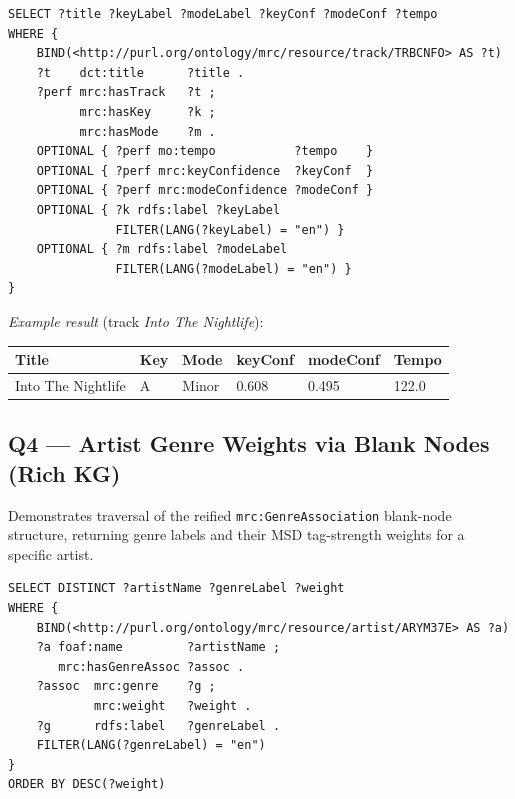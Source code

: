 \begin{footnotesize}
\begin{verbatim}
SELECT ?title ?keyLabel ?modeLabel ?keyConf ?modeConf ?tempo
WHERE {
    BIND(<http://purl.org/ontology/mrc/resource/track/TRBCNFO> AS ?t)
    ?t    dct:title      ?title .
    ?perf mrc:hasTrack   ?t ;
          mrc:hasKey     ?k ;
          mrc:hasMode    ?m .
    OPTIONAL { ?perf mo:tempo           ?tempo    }
    OPTIONAL { ?perf mrc:keyConfidence  ?keyConf  }
    OPTIONAL { ?perf mrc:modeConfidence ?modeConf }
    OPTIONAL { ?k rdfs:label ?keyLabel
               FILTER(LANG(?keyLabel) = "en") }
    OPTIONAL { ?m rdfs:label ?modeLabel
               FILTER(LANG(?modeLabel) = "en") }
}
\end{verbatim}
\end{footnotesize}

\noindent\textit{Example result} (track \textit{Into The Nightlife}):

\begin{table}[H]
\centering\footnotesize
\begin{tabular}{llllll}
\toprule
Title & Key & Mode & keyConf & modeConf & Tempo \\ \midrule
Into The Nightlife & A & Minor & 0.608 & 0.495 & 122.0 \\
\bottomrule
\end{tabular}
\end{table}

\subsection*{Q4 — Artist Genre Weights via Blank Nodes (Rich KG)}

Demonstrates traversal of the reified \texttt{mrc:GenreAssociation} blank-node structure, returning genre labels and their MSD tag-strength weights for a specific artist.

\begin{footnotesize}
\begin{verbatim}
SELECT DISTINCT ?artistName ?genreLabel ?weight
WHERE {
    BIND(<http://purl.org/ontology/mrc/resource/artist/ARYM37E> AS ?a)
    ?a foaf:name         ?artistName ;
       mrc:hasGenreAssoc ?assoc .
    ?assoc  mrc:genre    ?g ;
            mrc:weight   ?weight .
    ?g      rdfs:label   ?genreLabel .
    FILTER(LANG(?genreLabel) = "en")
}
ORDER BY DESC(?weight)
\end{verbatim}
\end{footnotesize}

